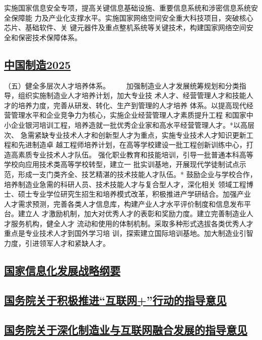 \documentclass[11pt]{ctexart}
\begin{document}
{{{{实施国家信息安全专项，提高关键信息基础设施、重要信息系统和涉密信息系统安全保障能
力及产业化支撑水平。实施国家网络空间安全重大科技项目，突破核心芯片、基础软件、关
键元器件及重点整机系统等关键技术，构建国家网络空间安全和保密技术保障体系。

\subsection{\href{http://www.gov.cn/zhengce/content/2015-05/19/content\_9784.htm}{中国制造2025}}
\label{sec:org256469a}

（五）健全多层次人才培养体系。
　　加强制造业人才发展统筹规划和分类指导，组织实施制造业人才培养计划，加大专业技
术人才、经营管理人才和技能人才的培养力度，完善从研发、转化、生产到管理的人才培养
体系。以提高现代经营管理水平和企业竞争力为核心，实施企业经营管理人才素质提升工程
和国家中小企业银河培训工程，培养造就一批优秀企业家和高水平经营管理人才。*以高层次、
急需紧缺专业技术人才和创新型人才为重点，实施专业技术人才知识更新工程和先进制造卓
越工程师培养计划，在高等学校建设一批工程创新训练中心，打造高素质专业技术人才队伍。
强化职业教育和技能培训，引导一批普通本科高等学校向应用技术类高等学校转型，建立一
批实训基地，开展现代学徒制试点示范，形成一支门类齐全、技艺精湛的技术技能人才队伍。*
鼓励企业与学校合作，培养制造业急需的科研人员、技术技能人才与复合型人才，深化相关
领域工程博士、硕士专业学位研究生招生和培养模式改革，积极推进产学研结合。加强产业
人才需求预测，完善各类人才信息库，构建产业人才水平评价制度和信息发布平台。建立人
才激励机制，加大对优秀人才的表彰和奖励力度。建立完善制造业人才服务机构，健全人才
流动和使用的体制机制。采取多种形式选拔各类优秀人才重点是专业技术人才到国外学习培
训，探索建立国际培训基地。加大制造业引智力度，引进领军人才和紧缺人才。

\subsection{\href{http://www.miit.gov.cn/n1146290/n1146392/c5168620/content.html}{国家信息化发展战略纲要}}
\label{sec:orgfb8c000}

\subsection{\href{http://www.gov.cn/zhengce/content/2015-07/04/content\_10002.htm}{国务院关于积极推进“互联网+”行动的指导意见}}
\label{sec:orga6892b0}

\subsection{\href{http://www.gov.cn/zhengce/content/2016-05/20/content\_5075099.htm}{国务院关于深化制造业与互联网融合发展的指导意见}}
\label{sec:orgb55cf84}

}}}}
\end{document}
